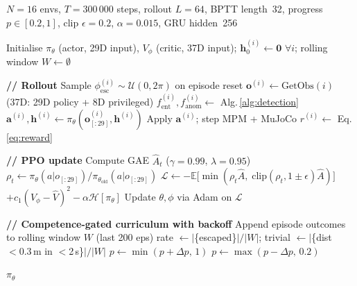 \documentclass[conference]{IEEEtran}
\begin{document}
\begin{algorithm}[!htbp]
  \caption{Curriculum PPO-GRU Training for Entrapment Recovery}
  \label{alg:training}
  \begin{algorithmic}[1]
    \Require $N{=}16$ envs, $T{=}300\,000$ steps, rollout $L{=}64$,
             BPTT length~32, progress $p{\in}[0.2,1]$,
             clip $\epsilon{=}0.2$, $\alpha{=}0.015$, GRU hidden~256

    \State Initialise $\pi_\theta$ (actor, 29D input),
           $V_\phi$ (critic, 37D input);
           $\mathbf{h}^{(i)}_0 \gets \mathbf{0}$ $\forall i$;
           rolling window $W \gets \emptyset$


      \State \textbf{// Rollout}
        \State Sample $\phi_\text{esc}^{(i)} \sim \mathcal{U}(0,2\pi)$
               on episode reset
        \State $\mathbf{o}^{(i)} \gets \text{GetObs}(i)$\quad
               (37D: 29D policy + 8D privileged)
        \State $f_\text{ent}^{(i)}, f_\text{anom}^{(i)} \gets$
               Alg.\,\ref{alg:detection}
        \State $\mathbf{a}^{(i)}, \mathbf{h}^{(i)} \gets
               \pi_\theta(\mathbf{o}^{(i)}_{[:29]}, \mathbf{h}^{(i)})$
        \State Apply $\mathbf{a}^{(i)}$; step MPM + MuJoCo
        \State $r^{(i)} \gets$ Eq.\,\eqref{eq:reward}
      \EndFor

      \State \textbf{// PPO update}
      \State Compute GAE $\hat{A}_t$ ($\gamma{=}0.99$, $\lambda{=}0.95$)
          \State $\rho_t \gets
                 \pi_\theta(a|o_{[:29]})/\pi_{\theta_\text{old}}(a|o_{[:29]})$
          \State $\mathcal{L} \gets
                 {-}\mathbb{E}\bigl[\min(\rho_t\hat{A},\;
                 \text{clip}(\rho_t,1{\pm}\epsilon)\hat{A})\bigr]$
                 $+ c_1(V_\phi - \hat{V})^2 - \alpha\mathcal{H}[\pi_\theta]$
          \State Update $\theta, \phi$ via Adam on $\mathcal{L}$
        \EndFor
      \EndFor

      \State \textbf{// Competence-gated curriculum with backoff}
      \State Append episode outcomes to rolling window $W$ (last 200 eps)
      \State rate $\gets |$\{escaped\}$|/|W|$;\quad
             trivial $\gets |$\{dist $< 0.3$\,m in $<$2\,s\}$|/|W|$
        \State $p \gets \min(p + \Delta p,\,1)$
        \State $p \gets \max(p - \Delta p,\,0.2)$
      \EndIf

    \EndFor
    \State \Return $\pi_\theta$
  \end{algorithmic}
\end{algorithm}
\end{document}
